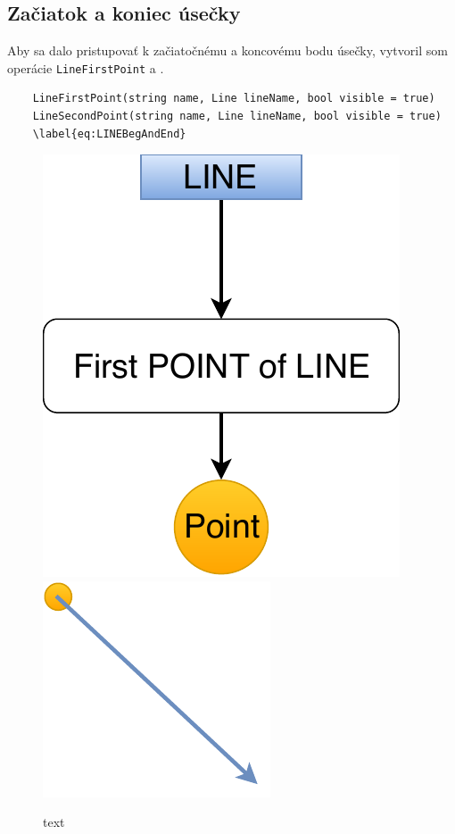 \subsection{Začiatok a koniec úsečky}
Aby sa dalo pristupovať k začiatočnému a koncovému bodu úsečky, vytvoril som operácie \texttt{LineFirstPoint} a .
\label{sec:begandendofline}

\begin{lstlisting}
    LineFirstPoint(string name, Line lineName, bool visible = true)
	LineSecondPoint(string name, Line lineName, bool visible = true)
	\label{eq:LINEBegAndEnd}
\end{lstlisting}
		
		


\begin{figure}[H]
	\centering
	\includegraphics[height=0.3\textwidth]{obrazky-figures/Diagram/DP Navrh operacii-0D - PointFirst POINT of LINE.pdf}
	\includegraphics[height=0.3\textwidth]{obrazky-figures/Diagram/Draw/1Points/DP Navrh operacii-0D - PointFirstPointOfLine.pdf}
	\caption{text}
	\label{fig:1}
\end{figure}



